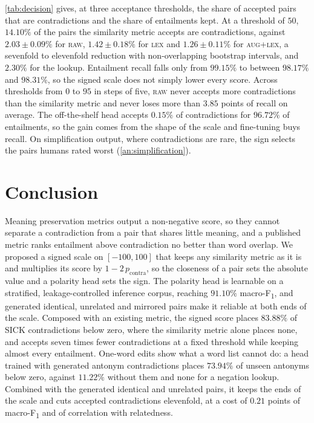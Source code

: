 \documentclass[11pt]{article}
\begin{document}
\autoref{tab:decision} gives, at three acceptance thresholds, the share of accepted pairs that are contradictions and the share of entailments kept.
At a threshold of $50$, $14.10\%$ of the pairs the similarity metric accepts are contradictions, against $2.03 \pm 0.09\%$ for \textsc{raw}, $1.42 \pm 0.18\%$ for \textsc{lex} and $1.26 \pm 0.11\%$ for \textsc{aug+lex}, a sevenfold to elevenfold reduction with non-overlapping bootstrap intervals, and $2.30\%$ for the lookup.
Entailment recall falls only from $99.15\%$ to between $98.17\%$ and $98.31\%$, so the signed scale does not simply lower every score.
Across thresholds from $0$ to $95$ in steps of five, \textsc{raw} never accepts more contradictions than the similarity metric and never loses more than $3.85$ points of recall on average.
The off-the-shelf head accepts $0.15\%$ of contradictions for $96.72\%$ of entailments, so the gain comes from the shape of the scale and fine-tuning buys recall.
On simplification output, where contradictions are rare, the sign selects the pairs humans rated worst (\autoref{an:simplification}).

\section{Conclusion}

Meaning preservation metrics output a non-negative score, so they cannot separate a contradiction from a pair that shares little meaning, and a published metric ranks entailment above contradiction no better than word overlap.
We proposed a signed scale on $[-100, 100]$ that keeps any similarity metric as it is and multiplies its score by $1 - 2\,p_{\mathrm{contra}}$, so the closeness of a pair sets the absolute value and a polarity head sets the sign.
The polarity head is learnable on a stratified, leakage-controlled inference corpus, reaching $91.10\%$ macro-F\textsubscript{1}, and generated identical, unrelated and mirrored pairs make it reliable at both ends of the scale.
Composed with an existing metric, the signed score places $83.88\%$ of SICK contradictions below zero, where the similarity metric alone places none, and accepts seven times fewer contradictions at a fixed threshold while keeping almost every entailment.
One-word edits show what a word list cannot do: a head trained with generated antonym contradictions places $73.94\%$ of unseen antonyms below zero, against $11.22\%$ without them and none for a negation lookup.
Combined with the generated identical and unrelated pairs, it keeps the ends of the scale and cuts accepted contradictions elevenfold, at a cost of $0.21$ points of macro-F\textsubscript{1} and of correlation with relatedness.
\end{document}

